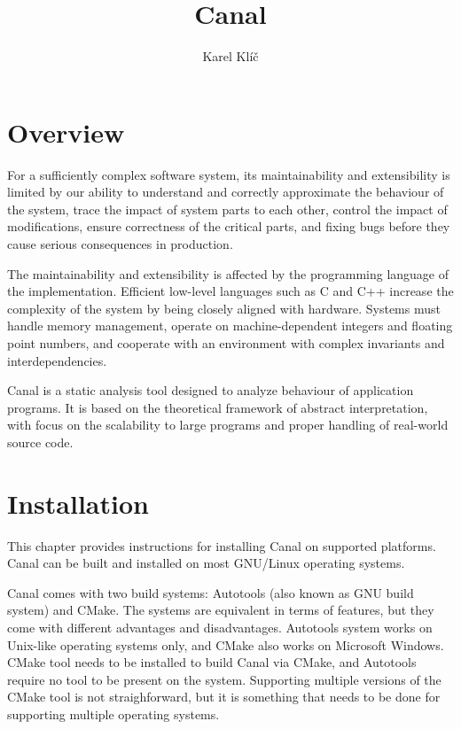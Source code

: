 \documentclass[a4paper]{book}
\title{Canal}
\author{Karel Klíč}
\begin{document}
\maketitle

\tableofcontents

\cleardoublepage

\chapter{Overview}

For a sufficiently complex software system, its maintainability and
extensibility is limited by our ability to understand and correctly
approximate the behaviour of the system, trace the impact of system
parts to each other, control the impact of modifications, ensure
correctness of the critical parts, and fixing bugs before they cause
serious consequences in production.

The maintainability and extensibility is affected by the programming
language of the implementation.  Efficient low-level languages such as
C and C++ increase the complexity of the system by being closely
aligned with hardware. Systems must handle memory management, operate
on machine-dependent integers and floating point numbers, and
cooperate with an environment with complex invariants and
interdependencies.

Canal is a static analysis tool designed to analyze behaviour of
application programs. It is based on the theoretical framework of
abstract interpretation, with focus on the scalability to large
programs and proper handling of real-world source code.

\chapter{Installation}

This chapter provides instructions for installing Canal on supported
platforms.  Canal can be built and installed on most GNU/Linux
operating systems.

Canal comes with two build systems: Autotools (also known as GNU build
system) and CMake. The systems are equivalent in terms of features,
but they come with different advantages and disadvantages.  Autotools
system works on Unix-like operating systems only, and CMake also works
on Microsoft Windows.  CMake tool needs to be installed to build Canal
via CMake, and Autotools require no tool to be present on the system.
Supporting multiple versions of the CMake tool is not straighforward,
but it is something that needs to be done for supporting multiple
operating systems.
\end{document}
